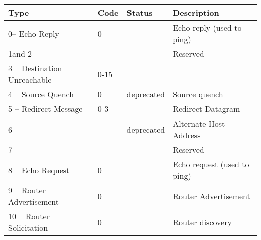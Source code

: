 \documentclass[12pt,journal]{IEEEtran}
\begin{document}

% 











\maketitle

\begin{table}[h]
\begin{tabular}{|l|l|l|l|}
\hline
Type                        & Code & Status     & Description                 \\ \hline
0– Echo Reply               & 0    &            & Echo reply (used to ping)   \\ \hline
1and 2                      &      &            & Reserved                    \\ \hline
3 – Destination Unreachable & 0-15 &            &                             \\ \hline
4 – Source Quench           & 0    & deprecated & Source quench               \\ \hline
5 – Redirect Message        & 0-3  &            & Redirect Datagram           \\ \hline
6                           &      & deprecated & Alternate Host Address      \\ \hline
7                           &      &            & Reserved                    \\ \hline
8 – Echo Request            & 0    &            & Echo request (used to ping) \\ \hline
9 – Router Advertisement    & 0    &            & Router Advertisement        \\ \hline
10 – Router Solicitation    & 0    &            & Router discovery            \\ \hline
\end{tabular}
\end{table}
\end{document}
